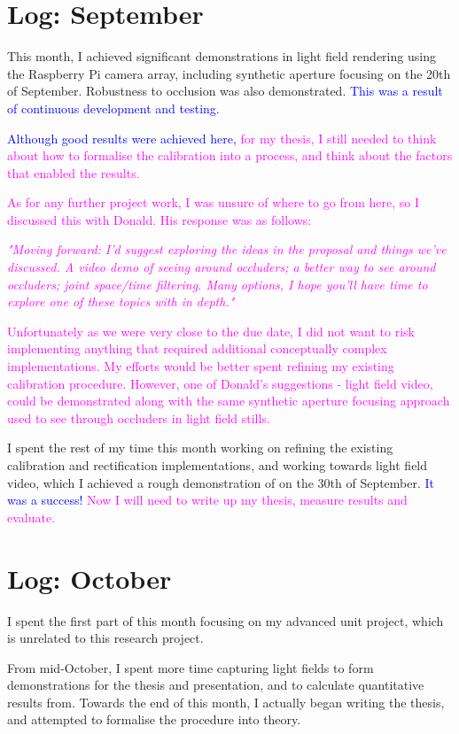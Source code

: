 \documentclass[a4paper, 12pt]{article}
\begin{document}
\section{Log: September}
This month, I achieved significant demonstrations in light field rendering using the Raspberry Pi camera array, including synthetic aperture focusing on the 20th of September. Robustness to occlusion was also demonstrated. \textcolor{Blue}{This was a result of continuous development and testing.}

\textcolor{Blue}{Although good results were achieved here,} \textcolor{Magenta}{for my thesis, I still needed to think about how to formalise the calibration into a process, and think about the factors that enabled the results.}

\textcolor{Magenta}{As for any further project work, I was unsure of where to go from here, so I discussed this with Donald. His response was as follows:}

\textcolor{Magenta}{\emph{"Moving forward: I'd suggest exploring the ideas in the proposal and things we've discussed. A video demo of seeing around occluders; a better way to see around occluders; joint space/time filtering. Many options, I hope you'll have time to explore one of these topics with in depth."}}

\textcolor{Magenta}{Unfortunately as we were very close to the due date, I did not want to risk implementing anything that required additional conceptually complex implementations. My efforts would be better spent refining my existing calibration procedure. However, one of Donald's suggestions - light field video, could be demonstrated along with the same synthetic aperture focusing approach used to see through occluders in light field stills.}

I spent the rest of my time this month working on refining the existing calibration and rectification implementations, and working towards light field video, which I achieved a rough demonstration of on the 30th of September. \textcolor{Blue}{It was a success!} \textcolor{Magenta}{Now I will need to write up my thesis, measure results and evaluate.}

\newpage
\section{Log: October}
I spent the first part of this month focusing on my advanced unit project, which is unrelated to this research project.

From mid-October, I spent more time capturing light fields to form demonstrations for the thesis and presentation, and to calculate quantitative results from. Towards the end of this month, I actually began writing the thesis, and attempted to formalise the procedure into theory.
\end{document}
